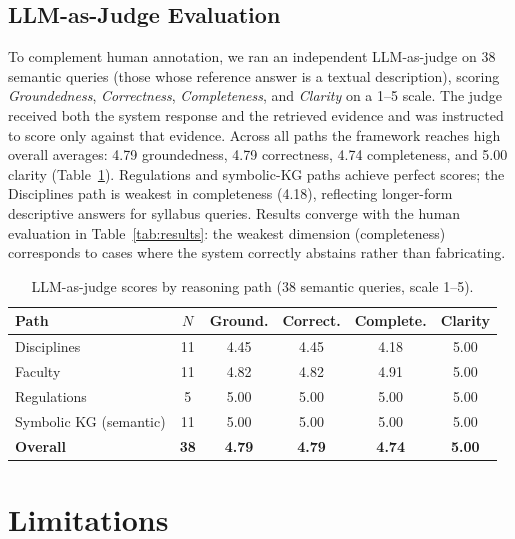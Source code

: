 \documentclass[runningheads]{llncs}
\begin{document}
\subsection{LLM-as-Judge Evaluation}

To complement human annotation, we ran an independent LLM-as-judge on 38 semantic queries (those whose reference answer is a textual description), scoring \textit{Groundedness}, \textit{Correctness}, \textit{Completeness}, and \textit{Clarity} on a 1--5 scale. The judge received both the system response and the retrieved evidence and was instructed to score only against that evidence. Across all paths the framework reaches high overall averages: 4.79 groundedness, 4.79 correctness, 4.74 completeness, and 5.00 clarity (Table~\ref{tab:judge_path}). Regulations and symbolic-KG paths achieve perfect scores; the Disciplines path is weakest in completeness (4.18), reflecting longer-form descriptive answers for syllabus queries. Results converge with the human evaluation in Table~\ref{tab:results}: the weakest dimension (completeness) corresponds to cases where the system correctly abstains rather than fabricating.

\begin{table}[t]
\caption{LLM-as-judge scores by reasoning path (38 semantic queries, scale 1--5).}
\label{tab:judge_path}
\centering
\begin{tabular}{lccccc}
\hline
\textbf{Path} & \textbf{$N$} & \textbf{Ground.} & \textbf{Correct.} & \textbf{Complete.} & \textbf{Clarity} \\
\hline
Disciplines            & 11 & 4.45 & 4.45 & 4.18 & 5.00 \\
Faculty                & 11 & 4.82 & 4.82 & 4.91 & 5.00 \\
Regulations            & 5  & 5.00 & 5.00 & 5.00 & 5.00 \\
Symbolic KG (semantic) & 11 & 5.00 & 5.00 & 5.00 & 5.00 \\
\hline
\textbf{Overall}       & \textbf{38} & \textbf{4.79} & \textbf{4.79} & \textbf{4.74} & \textbf{5.00} \\
\hline
\end{tabular}
\end{table}


\section{Limitations}
\end{document}
